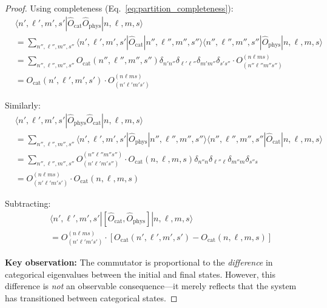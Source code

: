 \documentclass[twocolumn,10pt]{article}
\theoremstyle{remark}
\begin{document}
\begin{proof}
Using completeness (Eq.~\ref{eq:partition_completeness}):
\begin{align}
    &\langle n', \ell', m', s' | \hat{O}_{\text{cat}} \hat{O}_{\text{phys}} | n, \ell, m, s \rangle \nonumber \\
    &= \sum_{n'', \ell'', m'', s''} \langle n', \ell', m', s' | \hat{O}_{\text{cat}} | n'', \ell'', m'', s'' \rangle \langle n'', \ell'', m'', s'' | \hat{O}_{\text{phys}} | n, \ell, m, s \rangle \label{eq:first_term} \\
    &= \sum_{n'', \ell'', m'', s''} O_{\text{cat}}(n'', \ell'', m'', s'') \delta_{n'n''} \delta_{\ell'\ell''} \delta_{m'm''} \delta_{s's''} \cdot O^{(n\ell ms)}_{(n''\ell''m''s'')} \nonumber \\
    &= O_{\text{cat}}(n', \ell', m', s') \cdot O^{(n\ell ms)}_{(n'\ell'm's')} \label{eq:first_term_simplified}
\end{align}

Similarly:
\begin{align}
    &\langle n', \ell', m', s' | \hat{O}_{\text{phys}} \hat{O}_{\text{cat}} | n, \ell, m, s \rangle \nonumber \\
    &= \sum_{n'', \ell'', m'', s''} \langle n', \ell', m', s' | \hat{O}_{\text{phys}} | n'', \ell'', m'', s'' \rangle \langle n'', \ell'', m'', s'' | \hat{O}_{\text{cat}} | n, \ell, m, s \rangle \label{eq:second_term} \\
    &= \sum_{n'', \ell'', m'', s''} O^{(n''\ell''m''s'')}_{(n'\ell'm's'')} \cdot O_{\text{cat}}(n, \ell, m, s) \delta_{n''n} \delta_{\ell''\ell} \delta_{m''m} \delta_{s''s} \nonumber \\
    &= O^{(n\ell ms)}_{(n'\ell'm's')} \cdot O_{\text{cat}}(n, \ell, m, s) \label{eq:second_term_simplified}
\end{align}

Subtracting:
\begin{align}
    &\langle n', \ell', m', s' | [\hat{O}_{\text{cat}}, \hat{O}_{\text{phys}}] | n, \ell, m, s \rangle \nonumber \\
    &= O^{(n\ell ms)}_{(n'\ell'm's')} \cdot \left[O_{\text{cat}}(n', \ell', m', s') - O_{\text{cat}}(n, \ell, m, s)\right] \label{eq:commutator_result}
\end{align}

\textbf{Key observation:} The commutator is proportional to the \textit{difference} in categorical eigenvalues between the initial and final states. However, this difference is \textit{not} an observable consequence—it merely reflects that the system has transitioned between categorical states.


\end{proof}
\end{document}
